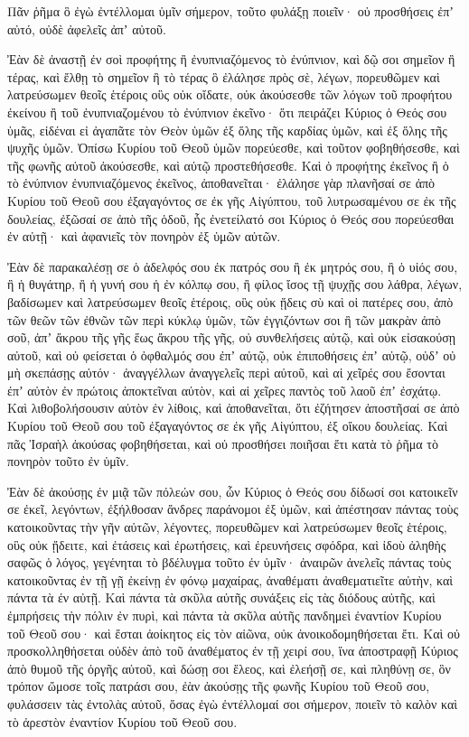 {Πᾶν ῥῆμα ὃ ἐγὼ ἐντέλλομαι ὑμῖν σήμερον, τοῦτο φυλάξῃ ποιεῖν· οὐ προσθήσεις ἐπʼ αὐτό, οὐδὲ ἀφελεῖς ἀπʼ αὐτοῦ.
\par }{\PP {}Ἐὰν δὲ ἀναστῇ ἐν σοὶ προφήτης ἢ ἐνυπνιαζόμενος τὸ ἐνύπνιον, καὶ δῷ σοι σημεῖον ἢ τέρας,
καὶ ἔλθῃ τὸ σημεῖον ἢ τὸ τέρας ὃ ἐλάλησε πρὸς σὲ, λέγων, πορευθῶμεν καὶ λατρεύσωμεν θεοῖς ἑτέροις οὓς οὐκ οἴδατε,
οὐκ ἀκούσεσθε τῶν λόγων τοῦ προφήτου ἐκείνου ἢ τοῦ ἐνυπνιαζομένου τὸ ἐνύπνιον ἐκεῖνο· ὅτι πειράζει Κύριος ὁ Θεός σου ὑμᾶς, εἰδέναι εἰ ἀγαπᾶτε τὸν Θεὸν ὑμῶν ἐξ ὅλης τῆς καρδίας ὑμῶν, καὶ ἐξ ὅλης τῆς ψυχῆς ὑμῶν.
Ὀπίσω Κυρίου τοῦ Θεοῦ ὑμῶν πορεύεσθε, καὶ τοῦτον φοβηθήσεσθε, καὶ τῆς φωνῆς αὐτοῦ ἀκούσεσθε, καὶ αὐτῷ προστεθήσεσθε.
Καὶ ὁ προφήτης ἐκεῖνος ἢ ὁ τὸ ἐνύπνιον ἐνυπνιαζόμενος ἐκεῖνος, ἀποθανεῖται· ἐλάλησε γὰρ πλανῆσαί σε ἀπὸ Κυρίου τοῦ Θεοῦ σου ἐξαγαγόντος σε ἐκ γῆς Αἰγύπτου, τοῦ λυτρωσαμένου σε ἐκ τῆς δουλείας, ἐξῶσαί σε ἀπὸ τῆς ὁδοῦ, ἧς ἐνετείλατό σοι Κύριος ὁ Θεός σου πορεύεσθαι ἐν αὐτῇ· καὶ ἀφανιεῖς τὸν πονηρὸν ἐξ ὑμῶν αὐτῶν.
\par }{\PP {}Ἐὰν δὲ παρακαλέσῃ σε ὁ ἀδελφός σου ἐκ πατρός σου ἢ ἐκ μητρός σου, ἢ ὁ υἱός σου, ἢ ἡ θυγάτηρ, ἢ ἡ γυνή σου ἡ ἐν κόλπῳ σου, ἢ φίλος ἴσος τῇ ψυχῇς σου λάθρα, λέγων, βαδίσωμεν καὶ λατρεύσωμεν θεοῖς ἑτέροις, οὓς οὐκ ᾔδεις σὺ καὶ οἱ πατέρες σου,
ἀπὸ τῶν θεῶν τῶν ἐθνῶν τῶν περὶ κύκλῳ ὑμῶν, τῶν ἐγγιζόντων σοι ἢ τῶν μακρὰν ἀπὸ σοῦ, ἀπʼ ἄκρου τῆς γῆς ἕως ἄκρου τῆς γῆς,
οὐ συνθελήσεις αὐτῷ, καὶ οὐκ εἰσακούσῃ αὐτοῦ, καὶ οὐ φείσεται ὁ ὀφθαλμός σου ἐπʼ αὐτῷ, οὐκ ἐπιποθήσεις ἐπʼ αὐτῷ, οὐδʼ οὐ μὴ σκεπάσῃς αὐτόν·
ἀναγγέλλων ἀναγγελεῖς περὶ αὐτοῦ, καὶ αἱ χεῖρές σου ἔσονται ἐπʼ αὐτὸν ἐν πρώτοις ἀποκτεῖναι αὐτὸν, καὶ αἱ χεῖρες παντὸς τοῦ λαοῦ ἐπʼ ἐσχάτῳ.
Καὶ λιθοβολήσουσιν αὐτὸν ἐν λίθοις, καὶ ἀποθανεῖται, ὅτι ἐζήτησεν ἀποστῆσαί σε ἀπὸ Κυρίου τοῦ Θεοῦ σου τοῦ ἐξαγαγόντος σε ἐκ γῆς Αἰγύπτου, ἐξ οἴκου δουλείας.
Καὶ πᾶς Ἰσραὴλ ἀκούσας φοβηθήσεται, καὶ οὐ προσθήσει ποιῆσαι ἔτι κατὰ τὸ ῥῆμα τὸ πονηρὸν τοῦτο ἐν ὑμῖν.
\par }{\PP {}Ἐὰν δὲ ἀκούσῃς ἐν μιᾷ τῶν πόλεών σου, ὧν Κύριος ὁ Θεός σου δίδωσί σοι κατοικεῖν σε ἐκεῖ, λεγόντων,
ἐξήλθοσαν ἄνδρες παράνομοι ἐξ ὑμῶν, καὶ ἀπέστησαν πάντας τοὺς κατοικοῦντας τὴν γῆν αὐτῶν, λέγοντες, πορευθῶμεν καὶ λατρεύσωμεν θεοῖς ἑτέροις, οὓς οὐκ ᾔδειτε,
καὶ ἐτάσεις καὶ ἐρωτήσεις, καὶ ἐρευνήσεις σφόδρα, καὶ ἰδοὺ ἀληθὴς σαφῶς ὁ λόγος, γεγένηται τὸ βδέλυγμα τοῦτο ἐν ὑμῖν·
ἀναιρῶν ἀνελεῖς πάντας τοὺς κατοικοῦντας ἐν τῇ γῇ ἐκείνῃ ἐν φόνῳ μαχαίρας, ἀναθέματι ἀναθεματιεῖτε αὐτὴν, καὶ πάντα τὰ ἐν αὐτῇ.
Καὶ πάντα τὰ σκῦλα αὐτῆς συνάξεις εἰς τὰς διόδους αὐτῆς, καὶ ἐμπρήσεις τὴν πόλιν ἐν πυρὶ, καὶ πάντα τὰ σκῦλα αὐτῆς πανδημεὶ ἐναντίον Κυρίου τοῦ Θεοῦ σου· καὶ ἔσται ἀοίκητος εἰς τὸν αἰῶνα, οὐκ ἀνοικοδομηθήσεται ἔτι.
Καὶ οὐ προσκολληθήσεται οὐδὲν ἀπὸ τοῦ ἀναθέματος ἐν τῇ χειρί σου, ἵνα ἀποστραφῇ Κύριος ἀπὸ θυμοῦ τῆς ὀργῆς αὐτοῦ, καὶ δώσῃ σοι ἔλεος, καὶ ἐλεήσῇ σε, καὶ πληθύνῃ σε, ὃν τρόπον ὤμοσε τοῖς πατράσι σου,
ἐὰν ἀκούσῃς τῆς φωνῆς Κυρίου τοῦ Θεοῦ σου, φυλάσσειν τὰς ἐντολὰς αὐτοῦ, ὅσας ἐγὼ ἐντέλλομαί σοι σήμερον, ποιεῖν τὸ καλὸν καὶ τὸ ἀρεστὸν ἐναντίον Κυρίου τοῦ Θεοῦ σου.

}
